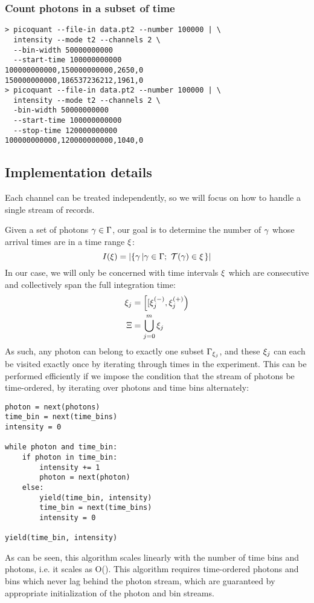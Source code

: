 \subsubsection{Count photons in a subset of time}
\begin{verbatim}
> picoquant --file-in data.pt2 --number 100000 | \
  intensity --mode t2 --channels 2 \
  --bin-width 50000000000 
  --start-time 100000000000
100000000000,150000000000,2650,0
150000000000,186537236212,1961,0
> picoquant --file-in data.pt2 --number 100000 | \
  intensity --mode t2 --channels 2 \
  -bin-width 50000000000 
  --start-time 100000000000
  --stop-time 120000000000
100000000000,120000000000,1040,0
\end{verbatim}

\subsection{Implementation details}
\label{sec:intensity_implementation}
Each channel can be treated independently, so we will focus on how to handle a single stream of records. 

Given a set of photons $\gamma\in\Gamma$, our goal is to determine the number of $\gamma$ whose arrival times are in a time range $\xi$:
\begin{equation}
I(\xi) = \left|\left\lbrace \gamma \left| \gamma\in\Gamma;~\mathcal{T}(\gamma)\in\xi \right. \right\rbrace\right|
\end{equation}
In our case, we will only be concerned with time intervals $\xi$ which are consecutive and collectively span the full integration time:
\begin{align}
\xi_{j} &= \left[[\xi_{j}^{(-)},\xi_{j}^{(+)}\right) \\
\Xi &= \bigcup\limits_{j=0}^{m}{\xi_{j}}
\end{align}
As such, any photon can belong to exactly one subset $\Gamma_{\xi_{j}}$, and these $\xi_{j}$ can each be visited exactly once by iterating through times in the experiment. This can be performed efficiently if we impose the condition that the stream of photons be time-ordered, by iterating over photons and time bins alternately:
\lstset{language=Python}
\begin{lstlisting}
photon = next(photons)
time_bin = next(time_bins)
intensity = 0

while photon and time_bin:
    if photon in time_bin:
        intensity += 1
        photon = next(photon)
    else:
        yield(time_bin, intensity)
        time_bin = next(time_bins)
        intensity = 0

yield(time_bin, intensity)
\end{lstlisting}
As can be seen, this algorithm scales linearly with the number of time bins and photons, i.e. it scales as O(\abs{\photons}). This algorithm requires time-ordered photons and bins which never lag behind the photon stream, which are guaranteed by appropriate initialization of the photon and bin streams.

